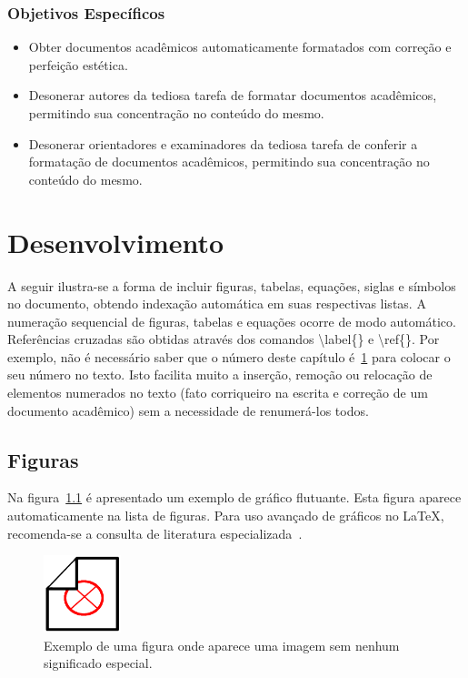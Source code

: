 \documentclass[oneside]{normas-utf-tex} %
\begin{document}
\subsection{Objetivos Espec\'ificos}

\begin{itemize}
	\item Obter documentos acad\^emicos automaticamente formatados com corre\c{c}\~ao e perfei\c{c}\~ao est\'etica.
	\item Desonerar autores da tediosa tarefa de formatar documentos acad\^emicos, permitindo sua concentra\c{c}\~ao no conte\'udo do mesmo.
	\item Desonerar orientadores e examinadores da tediosa tarefa de conferir a formata\c{c}\~ao de documentos acad\^emicos, permitindo sua concentra\c{c}\~ao no conte\'udo do mesmo.
\end{itemize}


\chapter{Desenvolvimento}
\label{chap:desenv}

A seguir ilustra-se a forma de incluir figuras, tabelas, equa\c{c}\~oes, siglas e s\'imbolos no documento, obtendo indexa\c{c}\~ao autom\'atica em suas respectivas listas. A numera\c{c}\~ao sequencial de figuras, tabelas e equa\c{c}\~oes ocorre de modo autom\'atico. Refer\^encias cruzadas s\~ao obtidas atrav\'es dos comandos {\ttfamily \textbackslash label\{\}} e {\ttfamily \textbackslash ref\{\}}. Por exemplo, n\~ao \'e necess\'ario saber que o n\'umero deste cap\'itulo \'e~\ref{chap:desenv} para colocar o seu n\'umero no texto. Isto facilita muito a inser\c{c}\~ao, remo\c{c}\~ao ou reloca\c{c}\~ao de elementos numerados no texto (fato corriqueiro na escrita e corre\c{c}\~ao de um documento acad\^emico) sem a necessidade de renumer\'a-los todos.

\section{Figuras}

Na figura~\ref{fig:dummy} \'e apresentado um exemplo de gr\'afico flutuante. Esta figura aparece automaticamente na lista de figuras. Para uso avan\c{c}ado de gr\'aficos no \LaTeX, recomenda-se a consulta de literatura especializada~\cite{Goossens2007}.


\begin{figure}[!htb]
	\centering
	\includegraphics[width=0.2\textwidth]{./dummy.png} %
	\caption[Exemplo de uma figura]{Exemplo de uma figura onde aparece uma imagem sem nenhum significado especial.}
	\label{fig:dummy}
\end{figure}
\end{document}
